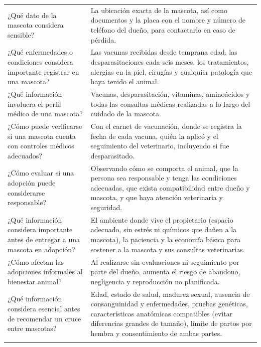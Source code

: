 \documentclass[journal,onecolumn]{IEEEtran}
\begin{document}
{\begin{longtable}{@{}p{5.6cm} p{9.4cm}@{}}
			¿Qué dato de la mascota considera sensible? & La ubicación exacta de la mascota, así como documentos y la placa con el nombre y número de teléfono del dueño, para contactarlo en caso de pérdida. \\ \addlinespace
			
			¿Qué enfermedades o condiciones considera importante registrar en una mascota? & Las vacunas recibidas desde temprana edad, las desparasitaciones cada seis meses, los tratamientos, alergias en la piel, cirugías y cualquier patología que haya tenido el animal. \\ \addlinespace
			
			¿Qué información involucra el perfil médico de una mascota? & Vacunas, desparasitación, vitaminas, aminoácidos y todas las consultas médicas realizadas a lo largo del cuidado de la mascota. \\ \addlinespace
			
			¿Cómo puede verificarse si una mascota cuenta con controles médicos adecuados? & Con el carnet de vacunación, donde se registra la fecha de cada vacuna, quién la aplicó y el seguimiento del veterinario, incluyendo si fue desparasitado. \\ \addlinespace
			
			¿Cómo evaluar si una adopción puede considerarse responsable? & Observando cómo se comporta el animal, que la persona sea responsable y tenga las condiciones adecuadas, que exista compatibilidad entre dueño y mascota, y que haya atención veterinaria y seguridad. \\ \addlinespace
			
			¿Qué información considera importante antes de entregar a una mascota en adopción? & El ambiente donde vive el propietario (espacio adecuado, sin estrés ni químicos que dañen a la mascota), la paciencia y la economía básica para sostener a la mascota y sus consultas veterinarias. \\ \addlinespace
			
			¿Cómo afectan las adopciones informales al bienestar animal? & Al realizarse sin evaluaciones ni seguimiento por parte del dueño, aumenta el riesgo de abandono, negligencia y reproducción no planificada. \\ \addlinespace
			
			¿Qué información considera esencial antes de recomendar un cruce entre mascotas? & Edad, estado de salud, madurez sexual, ausencia de consanguinidad y enfermedades, pruebas genéticas, características anatómicas compatibles (evitar diferencias grandes de tamaño), límite de partos por hembra y consentimiento de ambas partes. \\ \addlinespace
			

\end{longtable}}
\end{document}
